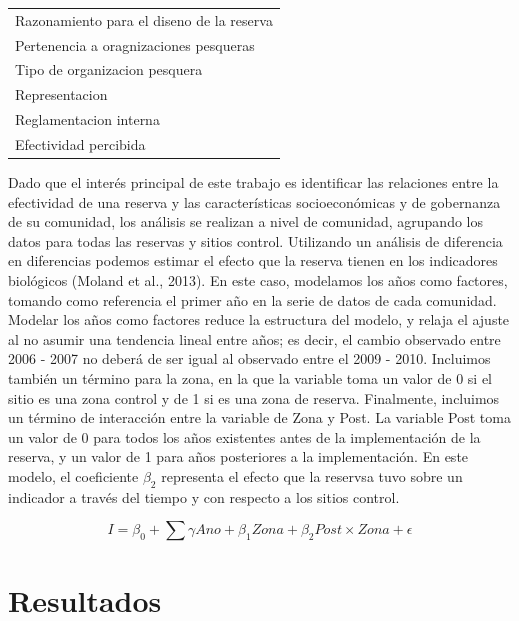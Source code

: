 \documentclass[12pt,]{article}
\begin{document}
\begin{table}
\begin{tabular}[t]{l}
\hspace{1em}Razonamiento para el diseno de la reserva\\
\hspace{1em}Pertenencia a oragnizaciones pesqueras\\
\hspace{1em}Tipo de organizacion pesquera\\
\addlinespace
\hspace{1em}Representacion\\
\hspace{1em}Reglamentacion interna\\
\hspace{1em}Efectividad percibida\\
\bottomrule
\end{tabular}
\end{table}

Dado que el interés principal de este trabajo es identificar las
relaciones entre la efectividad de una reserva y las características
socioeconómicas y de gobernanza de su comunidad, los análisis se
realizan a nivel de comunidad, agrupando los datos para todas las
reservas y sitios control. Utilizando un análisis de diferencia en
diferencias podemos estimar el efecto que la reserva tienen en los
indicadores biológicos (Moland et al., 2013). En este caso, modelamos
los años como factores, tomando como referencia el primer año en la
serie de datos de cada comunidad. Modelar los años como factores reduce
la estructura del modelo, y relaja el ajuste al no asumir una tendencia
lineal entre años; es decir, el cambio observado entre 2006 - 2007 no
deberá de ser igual al observado entre el 2009 - 2010. Incluimos también
un término para la zona, en la que la variable toma un valor de 0 si el
sitio es una zona control y de 1 si es una zona de reserva. Finalmente,
incluimos un término de interacción entre la variable de Zona y Post. La
variable Post toma un valor de 0 para todos los años existentes antes de
la implementación de la reserva, y un valor de 1 para años posteriores a
la implementación. En este modelo, el coeficiente \(\beta_2\) representa
el efecto que la reservsa tuvo sobre un indicador a través del tiempo y
con respecto a los sitios control.

\[I = \beta_0 + \sum \gamma Ano + \beta_1 Zona + \beta_2 Post\times Zona + \epsilon\]

\section{Resultados}\label{resultados}
\end{document}
